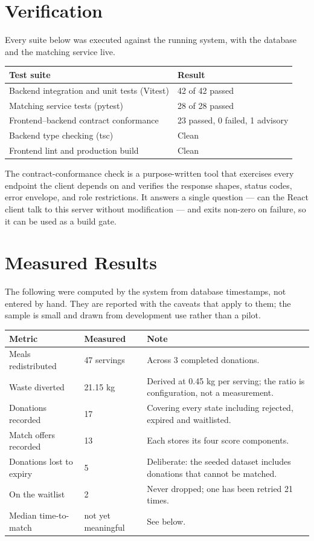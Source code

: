 \documentclass[12pt,a4paper]{report}
\begin{document}
\section{Verification}

Every suite below was executed against the running system, with the database and the matching service live.

\begin{longtable}{@{}p{7.5cm}p{6cm}@{}}
\toprule
\textbf{Test suite} & \textbf{Result} \\
\midrule
\endhead
Backend integration and unit tests (Vitest) & 42 of 42 passed \\
Matching service tests (pytest) & 28 of 28 passed \\
Frontend--backend contract conformance & 23 passed, 0 failed, 1 advisory \\
Backend type checking (tsc) & Clean \\
Frontend lint and production build & Clean \\
\bottomrule
\end{longtable}

The contract-conformance check is a purpose-written tool that exercises every endpoint the client depends on and verifies the response shapes, status codes, error envelope, and role restrictions. It answers a single question --- can the React client talk to this server without modification --- and exits non-zero on failure, so it can be used as a build gate.

\section{Measured Results}

The following were computed by the system from database timestamps, not entered by hand. They are reported with the caveats that apply to them; the sample is small and drawn from development use rather than a pilot.

\begin{longtable}{@{}p{3.3cm}p{3.2cm}p{7cm}@{}}
\toprule
\textbf{Metric} & \textbf{Measured} & \textbf{Note} \\
\midrule
\endhead
Meals redistributed & 47 servings & Across 3 completed donations. \\
Waste diverted & 21.15 kg & Derived at 0.45 kg per serving; the ratio is configuration, not a measurement. \\
Donations recorded & 17 & Covering every state including rejected, expired and waitlisted. \\
Match offers recorded & 13 & Each stores its four score components. \\
Donations lost to expiry & 5 & Deliberate: the seeded dataset includes donations that cannot be matched. \\
On the waitlist & 2 & Never dropped; one has been retried 21 times. \\
Median time-to-match & not yet meaningful & See below. \\
\bottomrule
\end{longtable}
\end{document}
